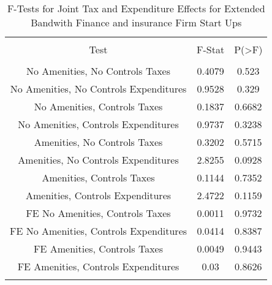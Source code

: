 
\begin{table}[!htbp] \centering 
  \caption{F-Tests for Joint Tax and Expenditure Effects for Extended Bandwith Finance and insurance Firm Start Ups} 
  \label{52Ftests} 
\begin{tabular}{@{\extracolsep{5pt}} ccc} 
\\[-1.8ex]\hline 
\hline \\[-1.8ex] 
Test & F-Stat & P(\textgreater F) \\ 
\hline \\[-1.8ex] 
No Amenities, No Controls Taxes & 0.4079 & 0.523 \\ 
No Amenities, No Controls Expenditures & 0.9528 & 0.329 \\ 
No Amenities, Controls Taxes & 0.1837 & 0.6682 \\ 
No Amenities, Controls Expenditures & 0.9737 & 0.3238 \\ 
Amenities, No Controls Taxes & 0.3202 & 0.5715 \\ 
Amenities, No Controls Expenditures & 2.8255 & 0.0928 \\ 
Amenities, Controls Taxes & 0.1144 & 0.7352 \\ 
Amenities, Controls Expenditures & 2.4722 & 0.1159 \\ 
FE No Amenities, Controls Taxes & 0.0011 & 0.9732 \\ 
FE No Amenities, Controls Expenditures & 0.0414 & 0.8387 \\ 
FE Amenities, Controls Taxes & 0.0049 & 0.9443 \\ 
FE Amenities, Controls Expenditures & 0.03 & 0.8626 \\ 
\hline \\[-1.8ex] 
\end{tabular} 
\end{table} 
